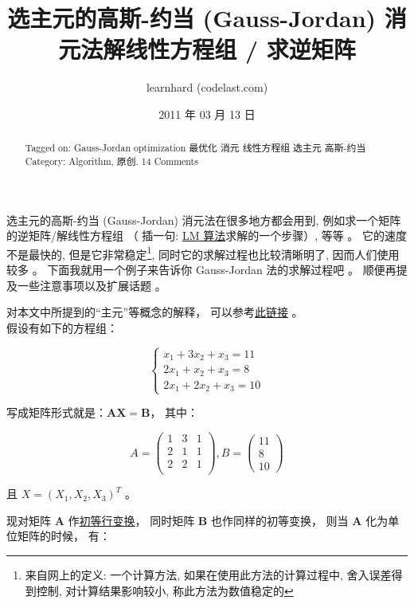 \documentclass[a4paper, 8pt]{article}
\title{选主元的高斯-约当 (Gauss-Jordan) 消元法解线性方程组 / 求逆矩阵}
\author{learnhard (codelast.com)}
\date{2011 年 03 月 13 日}
\newcommand{\matr}[1]{\mathbf{#1}}
\begin{document}
\maketitle
\begin{abstract}
Tagged on:	Gauss-Jordan	optimization	最优化	消元	线性方程组	选主元	高斯-约当 \\
Category:	Algorithm, 原创. 14 Comments 
\end{abstract}

	选主元的高斯-约当 (Gauss-Jordan) 消元法在很多地方都会用到, 例如求一个矩阵的逆矩阵/解线性方程组 （ 插一句: \href{http://www.codelast.com/?p=29}{LM 算法}求解的一个步骤）, 等等 。 它的速度不是最快的, 但是它非常稳定\footnote{来自网上的定义: 一个计算方法, 如果在使用此方法的计算过程中, 舍入误差得到控制, 对计算结果影响较小, 称此方法为数值稳定的}, 同时它的求解过程也比较清晰明了, 因而人们使用较多 。 下面我就用一个例子来告诉你 Gauss-Jordan 法的求解过程吧 。 顺便再提及一些注意事项以及扩展话题 。

对本文中所提到的“主元”等概念的解释， 可以参考\href{http://www.codelast.com/?page_id=963}{此链接} 。 \\
假设有如下的方程组：

\begin{equation}
\left\{
\begin{array}{lr}
x_1 + 3x_2 + x_3 = 11 \\
2x_1 + x_2 + x_3 = 8 \\
2x_1 + 2x_2 + x_3 = 10
\end{array}
\right.
\end{equation}

写成矩阵形式就是：$\matr{A}\matr{X}=\matr{B}$， 其中：

\begin{equation}
A = \begin{pmatrix}
1 & 3 & 1 \\
2 & 1 & 1 \\
2 & 2 & 1 \\
\end{pmatrix}, B = \begin{pmatrix}
11 \\ 8 \\ 10
\end{pmatrix}
\end{equation}

且 $X=(X_1, X_2, X_3)^T$ 。



现对矩阵 $\matr{A}$ 作\href{http://www.codelast.com/?page_id=963}{初等行变换}， 同时矩阵 $\matr{B}$ 也作同样的初等变换， 则当 $\matr{A}$ 化为单位矩阵的时候， 有：
\end{document}
